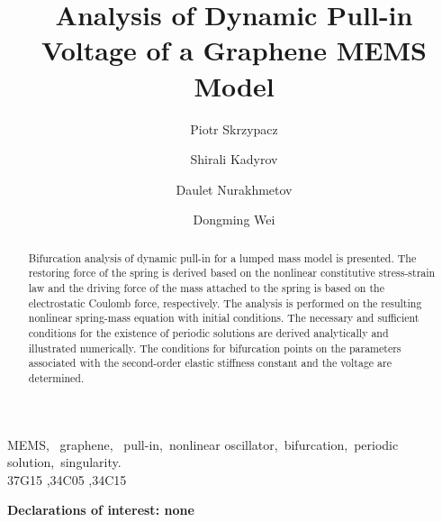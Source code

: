 \documentclass[review]{elsarticle}
\begin{document}
\begin{frontmatter}
\title{Analysis of Dynamic Pull-in Voltage of a Graphene MEMS Model}
\author[ad1]{Piotr Skrzypacz}
\address[ad1]{School of Science and Technology, Nazarbayev University, 
53 Kabanbay Batyr Ave., Astana, 010000, Kazakhstan}
\author[ad2]{Shirali Kadyrov}
\address[ad2]{Suleyman Demirel University, Kaskelen, 040900, Kazakhstan}
\author[ad3,ad1]{Daulet Nurakhmetov}
\address[ad3]{Department of Information System, S. Seifullin Kazakh Agrotechnical University, Zhenis Ave. 62, Astana, 
010011, Kazakhstan}
\author[ad1]{Dongming Wei}
\begin{abstract}
Bifurcation analysis of dynamic pull-in for a lumped mass model is presented. The restoring force of the spring is derived based on the nonlinear constitutive stress-strain law and the driving force of the mass attached to the spring is based on the electrostatic Coulomb force, respectively. The analysis is performed on the resulting nonlinear spring-mass equation with initial conditions. The necessary and sufficient conditions for the existence of periodic solutions are derived analytically and illustrated numerically. The conditions for bifurcation points on the parameters associated with the second-order elastic stiffness constant and the voltage are determined.
\end{abstract}
\begin{keyword}
MEMS\sep~ graphene\sep~ pull-in\sep~nonlinear oscillator\sep~bifurcation\sep~periodic solution\sep~singularity.\\
\MSC[2010] 37G15 %
\sep 34C05 %
\sep 34C15 %
\end{keyword}
\end{frontmatter}

{\bf Declarations of interest: none}\\
\end{document}

